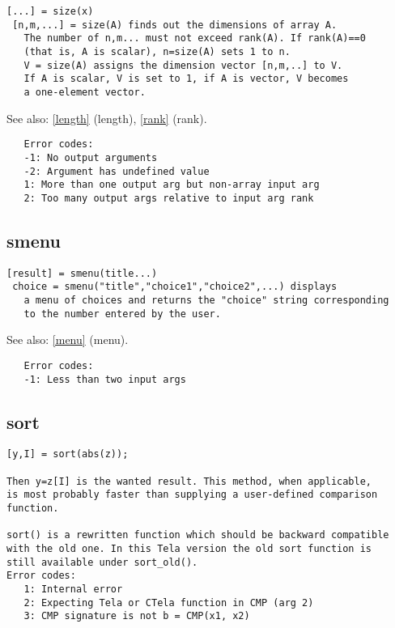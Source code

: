 \documentclass[a4paper]{article}
\begin{document}
\begin{tscreen}
\begin{verbatim}
[...] = size(x)
 [n,m,...] = size(A) finds out the dimensions of array A.
   The number of n,m... must not exceed rank(A). If rank(A)==0
   (that is, A is scalar), n=size(A) sets 1 to n.
   V = size(A) assigns the dimension vector [n,m,..] to V.
   If A is scalar, V is set to 1, if A is vector, V becomes
   a one-element vector.
\end{verbatim}

See also: \ref{length} {(length)}, \ref{rank} {(rank)}.
\begin{verbatim}
   Error codes:
   -1: No output arguments
   -2: Argument has undefined value
   1: More than one output arg but non-array input arg
   2: Too many output args relative to input arg rank 
\end{verbatim}
\end{tscreen}





\subsection{smenu\label{smenu}}

\begin{tscreen}
\begin{verbatim}
[result] = smenu(title...)
 choice = smenu("title","choice1","choice2",...) displays
   a menu of choices and returns the "choice" string corresponding
   to the number entered by the user.
\end{verbatim}

See also: \ref{menu} {(menu)}.
\begin{verbatim}
   Error codes:
   -1: Less than two input args 
\end{verbatim}
\end{tscreen}





\subsection{sort\label{sort}}

\begin{tscreen}
\begin{verbatim}
[y,I] = sort(abs(z));

Then y=z[I] is the wanted result. This method, when applicable,
is most probably faster than supplying a user-defined comparison
function.

sort() is a rewritten function which should be backward compatible
with the old one. In this Tela version the old sort function is
still available under sort_old().
Error codes:
   1: Internal error
   2: Expecting Tela or CTela function in CMP (arg 2)
   3: CMP signature is not b = CMP(x1, x2)
\end{verbatim}
\end{tscreen}
\end{document}
